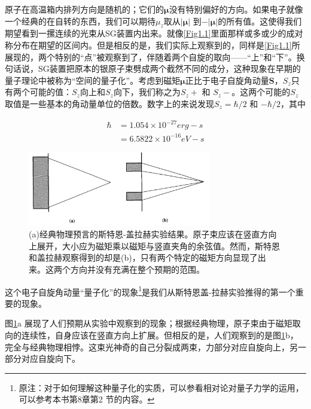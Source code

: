 \documentclass[UTF8,twoside]{ctexart}
\begin{document}
原子在高温箱内排列方向是随机的；它们的$\bm \mu$没有特别偏好的方向。如果电子就像一个经典的在自转的东西，我们可以期待$\mu_z$取从$\left|\bm \mu \right|$ 到$-\left|\bm \mu \right|$的所有值。这使得我们期望看到一摞连续的光束从SG装置内出来。就像{\ref{Fig1.1}}里面那样或多或少的成对称分布在期望的区间内。但是相反的是，我们实际上观察到的，同样是{\ref{Fig1.1}}所展现的，两个特别的“点”被观察到了，伴随着两个自旋的取向——“上”和“下”。换句话说，SG装置把原本的银原子束劈成两个截然不同的成分，这种现象在早期的量子理论中被称为“空间的量子化”。考虑到磁矩$\bm \mu$正比于电子自旋角动量$\bm S$，$S_z$只有两个可能的值：$S_z$向上和$S_z$向下，我们称之为$S_z+$ 和 $S_z-$。这两个可能的$S_z$取值是一些基本的角动量单位的倍数。数字上的来说发现$S_z = \hbar / 2$ 和 $-\hbar / 2$，其中

\begin{equation}
\begin{split}
\hbar & = 1.054 \times 10^{-27} erg-s\\
& = 6.5822 \times 10^{-16}eV-s
\end{split}
\end{equation}

\begin{figure}
\begin{centering}
\includegraphics[width = 8cm]{./Sakurai/Fig_1.2.png}
\caption{(a)经典物理预言的斯特恩-盖拉赫实验结果。原子束应该在竖直方向上展开，大小应为磁矩乘以磁矩与竖直夹角的余弦值。然而，斯特恩和盖拉赫观察得到的却是(b)，只有两个特定的磁矩方向显现了出来。这两个方向并没有充满在整个预期的范围。}
\label {Fig1.2}
\end{centering}
\end{figure}

\noindent 这个电子自旋角动量“量子化”的现象\footnote{原注：对于如何理解这种量子化的实质，可以参看相对论对量子力学的运用，可以参考本书第8章第2 节的内容。}是我们从斯特恩盖-拉赫实验推得的第一个重要的现象。

图{\ref{Fig1.2}}a 展现了人们预期从实验中观察到的现象；根据经典物理，原子束由于磁矩取向的连续性，自身应该在竖直方向上扩展。但相反的是，人们观察到的是图{\ref{Fig1.2}}b，完全与经典物理相悖。这束光神奇的自己分裂成两束，力部分对应自旋向上，另一部分对应自旋向下。
\end{document}
